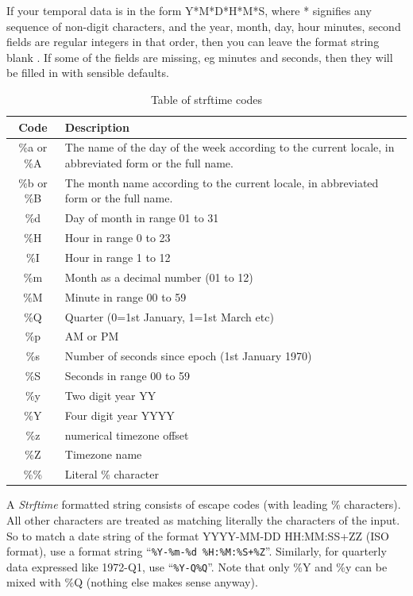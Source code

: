 If your temporal data is in the form Y{*}M{*}D{*}H{*}M{*}S, where
{*} signifies any sequence of non-digit characters, and the year,
month, day, hour minutes, second fields are regular integers in that
order, then you can leave the format string blank .
If some of the fields are missing, eg minutes and seconds, then they
will be filled in with sensible defaults.
\begin{center}
\par\end{center}

\begin{table}
\begin{tabular}{|c|l|}
\hline 
Code  & Description \tabularnewline
\hline 
\%a or \%A  & The name of the day of the week according to the current locale, in
abbreviated form or the full name.\tabularnewline
\%b or \%B  & The month name according to the current locale, in abbreviated form
or the full name.\tabularnewline
\%d  & Day of month in range 01 to 31\tabularnewline
\%H  & Hour in range 0 to 23\tabularnewline
\%I  & Hour in range 1 to 12\tabularnewline
\%m  & Month as a decimal number (01 to 12)\tabularnewline
\%M  & Minute in range 00 to 59\tabularnewline
\%Q  & Quarter (0=1st January, 1=1st March etc)\tabularnewline
\%p  & AM or PM\tabularnewline
\%s  & Number of seconds since epoch (1st January 1970)\tabularnewline
\%S  & Seconds in range 00 to 59 \tabularnewline
\%y  & Two digit year YY\tabularnewline
\%Y  & Four digit year YYYY\tabularnewline
\%z  & numerical timezone offset\tabularnewline
\%Z  & Timezone name\tabularnewline
\%\%  & Literal \% character\tabularnewline
\hline 
\end{tabular}\caption{Table of strftime codes}
\label{Strftime code} 
\end{table}

A \emph{Strftime }formatted string consists of escape codes (with
leading \% characters). All other characters are treated as matching
literally the characters of the input. So to match a date string of
the format YYYY-MM-DD HH:MM:SS+ZZ (ISO format), use a format string
``\verb|%Y-%m-%d %H:%M:%S+%Z|''. Similarly, for quarterly data
expressed like 1972-Q1, use ``\verb+%Y-Q%Q+''. Note that only \%Y
and \%y can be mixed with \%Q (nothing else makes sense anyway).


